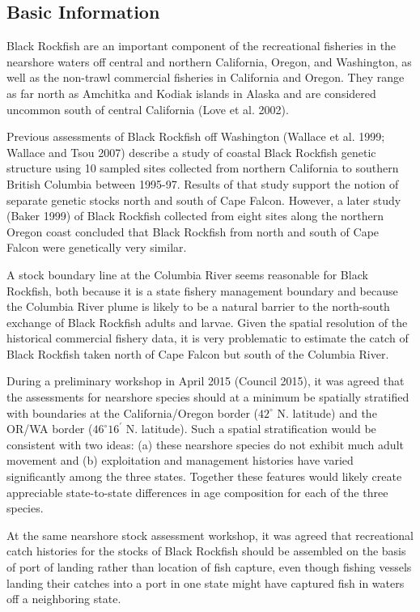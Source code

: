 \documentclass[11pt,
  letterpaper,
]{article}
\begin{document}
\hypertarget{basic-information}{%
\subsection{Basic Information}\label{basic-information}}

Black Rockfish are an important component of the recreational fisheries in the nearshore waters off central and northern California, Oregon, and Washington, as well as the non-trawl commercial fisheries in California and Oregon. They range as far north as Amchitka and Kodiak islands in Alaska and are considered uncommon south of central California (Love et al. 2002).

Previous assessments of Black Rockfish off Washington (Wallace et al. 1999; Wallace and Tsou 2007) describe a study of coastal Black Rockfish genetic structure using 10 sampled sites collected from northern California to southern British Columbia between 1995-97. Results of that study support the notion of separate genetic stocks north and south of Cape Falcon. However, a later study (Baker 1999) of Black Rockfish collected from eight sites along the northern Oregon coast concluded that Black Rockfish from north and south of Cape Falcon were genetically very similar.

A stock boundary line at the Columbia River seems reasonable for Black Rockfish, both because it is a state fishery management boundary and because the Columbia River plume is likely to be a natural barrier to the north-south exchange of Black Rockfish adults and larvae. Given the spatial resolution of the historical commercial fishery data, it is very problematic to estimate the catch of Black Rockfish taken north of Cape Falcon but south of the Columbia River.

During a preliminary workshop in April 2015 (Council 2015), it was agreed that the assessments for nearshore species should at a minimum be spatially stratified with boundaries at the California/Oregon border (\(42^\circ\) N. latitude) and the OR/WA border (\(46^\circ 16^\prime\) N. latitude). Such a spatial stratification would be consistent with two ideas: (a) these nearshore species do not exhibit much adult movement and (b) exploitation and management histories have varied significantly among the three states. Together these features would likely create appreciable state-to-state differences in age composition for each of the three species.

At the same nearshore stock assessment workshop, it was agreed that recreational catch histories for the stocks of Black Rockfish should be assembled on the basis of port of landing rather than location of fish capture, even though fishing vessels landing their catches into a port in one state might have captured fish in waters off a neighboring state.
\end{document}
